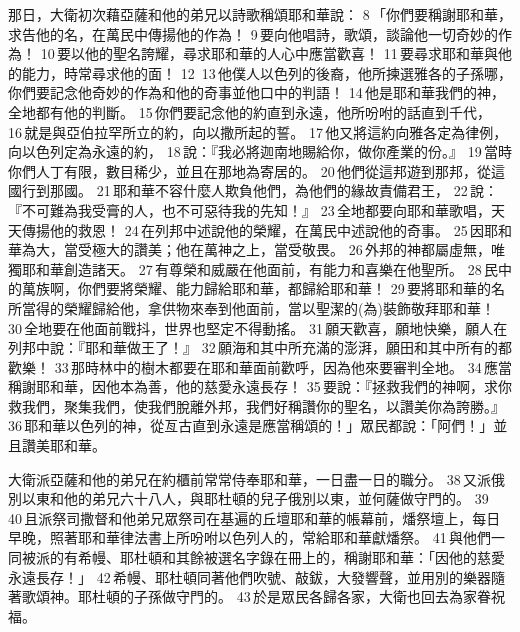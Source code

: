 那日，大衛初次藉亞薩和他的弟兄以詩歌稱頌耶和華說： 8 「你們要稱謝耶和華，求告他的名，在萬民中傳揚他的作為！ 9 要向他唱詩，歌頌，談論他一切奇妙的作為！ 10 要以他的聖名誇耀，尋求耶和華的人心中應當歡喜！ 11 要尋求耶和華與他的能力，時常尋求他的面！ 12  13 他僕人以色列的後裔，他所揀選雅各的子孫哪，你們要記念他奇妙的作為和他的奇事並他口中的判語！ 14 他是耶和華我們的神，全地都有他的判斷。 15 你們要記念他的約直到永遠，他所吩咐的話直到千代， 16 就是與亞伯拉罕所立的約，向以撒所起的誓。 17 他又將這約向雅各定為律例，向以色列定為永遠的約， 18 說：『我必將迦南地賜給你，做你產業的份。』 19 當時你們人丁有限，數目稀少，並且在那地為寄居的。 20 他們從這邦遊到那邦，從這國行到那國。 21 耶和華不容什麼人欺負他們，為他們的緣故責備君王， 22 說：『不可難為我受膏的人，也不可惡待我的先知！』 23 全地都要向耶和華歌唱，天天傳揚他的救恩！ 24 在列邦中述說他的榮耀，在萬民中述說他的奇事。 25 因耶和華為大，當受極大的讚美；他在萬神之上，當受敬畏。 26 外邦的神都屬虛無，唯獨耶和華創造諸天。 27 有尊榮和威嚴在他面前，有能力和喜樂在他聖所。 28 民中的萬族啊，你們要將榮耀、能力歸給耶和華，都歸給耶和華！ 29 要將耶和華的名所當得的榮耀歸給他，拿供物來奉到他面前，當以聖潔的(為)裝飾敬拜耶和華！ 30 全地要在他面前戰抖，世界也堅定不得動搖。 31 願天歡喜，願地快樂，願人在列邦中說：『耶和華做王了！』 32 願海和其中所充滿的澎湃，願田和其中所有的都歡樂！ 33 那時林中的樹木都要在耶和華面前歡呼，因為他來要審判全地。 34 應當稱謝耶和華，因他本為善，他的慈愛永遠長存！ 35 要說：『拯救我們的神啊，求你救我們，聚集我們，使我們脫離外邦，我們好稱讚你的聖名，以讚美你為誇勝。』 36 耶和華以色列的神，從亙古直到永遠是應當稱頌的！」眾民都說：「阿們！」並且讚美耶和華。

大衛派亞薩和他的弟兄在約櫃前常常侍奉耶和華，一日盡一日的職分。 38 又派俄別以東和他的弟兄六十八人，與耶杜頓的兒子俄別以東，並何薩做守門的。 39  40 且派祭司撒督和他弟兄眾祭司在基遍的丘壇耶和華的帳幕前，燔祭壇上，每日早晚，照著耶和華律法書上所吩咐以色列人的，常給耶和華獻燔祭。 41 與他們一同被派的有希幔、耶杜頓和其餘被選名字錄在冊上的，稱謝耶和華：「因他的慈愛永遠長存！」 42 希幔、耶杜頓同著他們吹號、敲鈸，大發響聲，並用別的樂器隨著歌頌神。耶杜頓的子孫做守門的。 43 於是眾民各歸各家，大衛也回去為家眷祝福。

